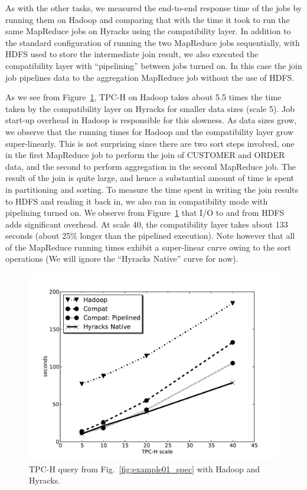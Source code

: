As with the other tasks, we measured the end-to-end response time of the jobs by running them on Hadoop and comparing that with the time it took to run the
same MapReduce jobs on Hyracks using the compatibility layer. In addition to the standard configuration of running the two MapReduce jobs sequentially, with HDFS used to store
the intermediate join result, we also executed the compatibility layer with ``pipelining'' between jobs turned on. In this case the join job pipelines data to the aggregation
MapReduce job without the use of HDFS.

As we see from Figure~\ref{fig:tpch-sizeup}, TPC-H on Hadoop takes about 5.5 times the time taken by the compatibility
layer on Hyracks for smaller data sizes (scale 5). Job start-up overhead in Hadoop is responsible for this slowness. As data sizes grow, we observe that the running times for
Hadoop and the compatibility
layer grow super-linearly. This is not surprising since there are two sort steps involved, one in the first MapReduce job to perform the join of CUSTOMER and ORDER data, and
the second to perform aggregation in the second MapReduce job. The result of the join is quite large, and hence a substantial amount of time is spent in partitioning and
sorting. To measure the time spent in writing the join results to HDFS and reading it back in, we also ran in compatibility mode with pipelining turned on. We observe from
Figure~\ref{fig:tpch-sizeup} that I/O to and from HDFS adds significant overhead. At scale 40, the compatibility layer takes about 133 seconds (about 25\% longer
than the pipelined execution).
Note however that all of the MapReduce running times exhibit a super-linear curve owing to the sort operations (We will ignore the ``Hyracks Native'' curve for now).

\begin{figure} [htb!]
  \centering
  \includegraphics[scale=0.6]{images/tpch-sizeup}
  \caption{TPC-H query from Fig.~\ref{fig:example01_spec} with Hadoop and Hyracks.}
  \label{fig:tpch-sizeup}
\end{figure}

